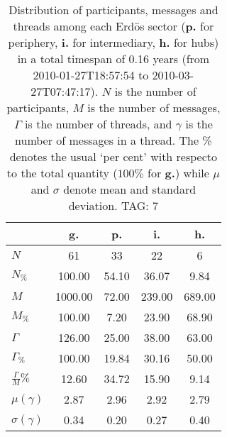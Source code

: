 \begin{table}[h!]
\begin{center}
\begin{tabular}{| l || c | c | c | c |}\hline
 & {\bf g.} & {\bf p.} & {\bf i.} & {\bf h.} \\\hline\hline
$N$ & 61  & 33  & 22  & 6 \\
$N_{\%}$ & 100.00  & 54.10  & 36.07  & 9.84 \\\hline
$M$ & 1000.00  & 72.00  & 239.00  & 689.00 \\
$M_{\%}$ & 100.00  & 7.20  & 23.90  & 68.90 \\\hline
$\Gamma$ & 126.00  & 25.00  & 38.00  & 63.00 \\
$\Gamma_{\%}$ & 100.00  & 19.84  & 30.16  & 50.00 \\\hline
$\frac{\Gamma}{M}\%$ & 12.60  & 34.72  & 15.90  & 9.14 \\
$\mu(\gamma)$ & 2.87  & 2.96  & 2.92  & 2.79 \\
$\sigma(\gamma)$ & 0.34  & 0.20  & 0.27  & 0.40 \\\hline
\end{tabular}
\caption{Distribution of participants, messages and threads among each Erd\"os sector ({\bf p.} for periphery, {\bf i.} for intermediary, 
    {\bf h.} for hubs) in a total timespan of 0.16 years (from 2010-01-27T18:57:54 to 2010-03-27T07:47:17). $N$ is the number of participants, $M$ is the number of messages, $\Gamma$ is the number of threads, and $\gamma$ is the number of messages in a thread.
    The \% denotes the usual `per cent' with respecto to the total quantity ($100\%$ for {\bf g.})
    while $\mu$ and $\sigma$ denote mean and standard deviation. TAG: 7}
\end{center}
\end{table}